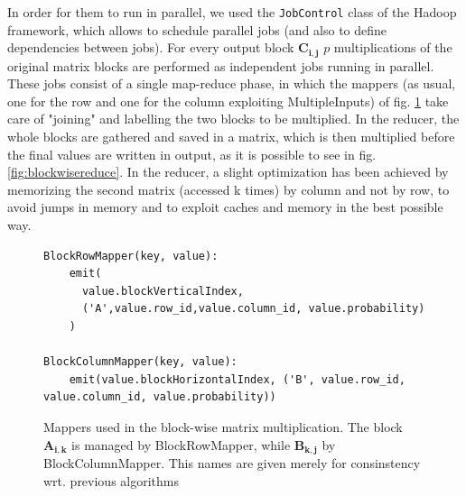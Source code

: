 In order for them to run in parallel, we used the \texttt{JobControl} class of the Hadoop framework, which allows to
schedule parallel jobs (and also to define dependencies between jobs). For every output block $\mathbf{C_{i,j}}$ $p$ 
multiplications of the original matrix blocks are performed as independent jobs running in parallel. 
These jobs consist of a single map-reduce phase, in which the mappers (as usual, one for the row and one for the column exploiting MultipleInputs) of fig. \ref{fig:blockwisemap} take care of "joining" and labelling the two blocks to be multiplied.
In the reducer, the whole blocks are gathered and saved in a matrix, which is then multiplied before the final values
are written in output, as it is possible to see in fig. \ref{fig:blockwisereduce}.
In the reducer, a slight optimization has been achieved by memorizing the second matrix (accessed k times) by column
and not by row, to avoid jumps in memory and to exploit caches and memory in the best possible way.

\begin{figure}
\begin{verbatim}
BlockRowMapper(key, value):
    emit(
      value.blockVerticalIndex, 
      ('A',value.row_id,value.column_id, value.probability)
    )

BlockColumnMapper(key, value):
    emit(value.blockHorizontalIndex, ('B', value.row_id, value.column_id, value.probability))
\end{verbatim}
\caption{Mappers used in the block-wise matrix multiplication. The block $\mathbf{A_{i,k}}$ is managed by BlockRowMapper, while $\mathbf{B_{k,j}}$ by BlockColumnMapper. This names are given merely for consinstency wrt. previous algorithms} 
\label{fig:blockwisemap}
\end{figure}

